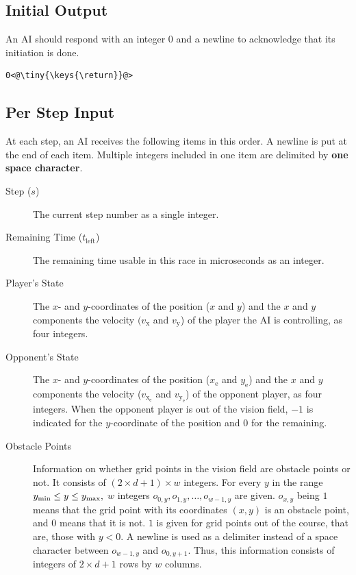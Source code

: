 \documentclass[11pt]{article}
\begin{document}
\subsection{Initial Output}\label{sec:output_init}
An AI should respond with an integer $0$ and a newline to acknowledge that its
initiation is done.

\begin{lstlisting}
0<@\tiny{\keys{\return}}@>
\end{lstlisting}

\subsection{Per Step Input}
At each step, an AI receives the following items in this order.
A newline is put at the end of each item. Multiple integers included in one item are delimited by {\bf one space character}.
\begin{description}
\item[Step ($s$)] The current step number as a single integer.
\item[Remaining Time ($t_\mathrm{left}$)] The remaining time usable in this race in
  microseconds as an integer.
\item[Player's State] The $x$- and $y$-coordinates of the position ($x$ and $y$) and
  the $x$ and $y$ components the velocity $(v_\mathrm{x}$ and $v_\mathrm{y}$) of the player the AI is
  controlling, as four integers.
\item[Opponent's State] The $x$- and $y$-coordinates of the position ($x_\mathrm{e}$ and $y_\mathrm{e}$) and
  the $x$ and $y$ components the velocity ($v_{\mathrm{x}_\mathrm{e}}$ and $v_{\mathrm{y}_\mathrm{e}}$) of the opponent player, as
  four integers.  When the opponent player is out of the vision field,
  $-1$ is indicated for the $y$-coordinate of the position and $0$ for
  the remaining.
\item[Obstacle Points] Information on whether grid points in
  the vision field are obstacle points or not.  It consists of
  $(2\times d+1)\times w$ integers.  For every $y$ in the range
  $y_{\rm min} \le y \le y_{\rm max},$ $w$ integers $o_{0,y}, o_{1,y},
  \ldots, o_{w-1,y}$ are given.  $o_{x,y}$ being $1$ means that the
  grid point with its coordinates $(x,y)$ is an obstacle point, and
  $0$ means that it is not.  $1$ is given for grid points out of the
  course, that are, those with $y<0$.  A newline is used as a
  delimiter instead of a space character between $o_{w-1,y}$ and $o_{0,y+1}$.
  Thus, this information consists of integers of $2 \times d + 1$ rows by $w$ columns.

\end{description}
\end{document}
